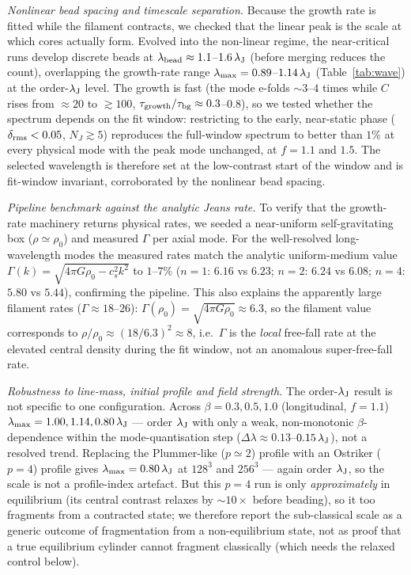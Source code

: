 \documentclass[usenatbib,twoside,twocolumn]{mnras}
\begin{document}
\emph{Nonlinear bead spacing and timescale separation.} Because the growth rate is fitted while the filament contracts, we checked that the linear peak is the scale at which cores actually form. Evolved into the non-linear regime, the near-critical runs develop discrete beads at $\lambda_{\rm bead}\approx1.1$--$1.6\,\lambda_{\rm J}$ (before merging reduces the count), overlapping the growth-rate range $\lambda_{\rm max}=0.89$--$1.14\,\lambda_{\rm J}$ (Table~\ref{tab:wave}) at the order-$\lambda_{\rm J}$ level. The growth is fast (the mode e-folds $\sim3$--$4$ times while $C$ rises from $\approx20$ to $\gtrsim100$, $\tau_{\rm growth}/\tau_{\rm bg}\approx0.3$--$0.8$), so we tested whether the spectrum depends on the fit window: restricting to the early, near-static phase ($\delta_{\rm rms}<0.05$, $N_J\gtrsim5$) reproduces the full-window spectrum to better than $1\%$ at every physical mode with the peak mode unchanged, at $f=1.1$ and $1.5$. The selected wavelength is therefore set at the low-contrast start of the window and is fit-window invariant, corroborated by the nonlinear bead spacing.

\emph{Pipeline benchmark against the analytic Jeans rate.} To verify that the growth-rate machinery returns physical rates, we seeded a near-uniform self-gravitating box ($\rho\simeq\rho_0$) and measured $\Gamma$ per axial mode. For the well-resolved long-wavelength modes the measured rates match the analytic uniform-medium value $\Gamma(k)=\sqrt{4\pi G\rho_0-c_s^2k^2}$ to $1$--$7\%$ ($n{=}1$: $6.16$ vs $6.23$; $n{=}2$: $6.24$ vs $6.08$; $n{=}4$: $5.80$ vs $5.44$), confirming the pipeline. This also explains the apparently large filament rates ($\Gamma\approx18$--$26$): $\Gamma(\rho_0)=\sqrt{4\pi G\rho_0}\approx6.3$, so the filament value corresponds to $\rho/\rho_0\approx(18/6.3)^2\approx8$, i.e.\ $\Gamma$ is the \emph{local} free-fall rate at the elevated central density during the fit window, not an anomalous super-free-fall rate.

\emph{Robustness to line-mass, initial profile and field strength.} The order-$\lambda_{\rm J}$ result is not specific to one configuration. Across $\beta=0.3,0.5,1.0$ (longitudinal, $f=1.1$) $\lambda_{\rm max}=1.00,1.14,0.80\,\lambda_{\rm J}$ --- order $\lambda_{\rm J}$ with only a weak, non-monotonic $\beta$-dependence within the mode-quantisation step ($\Delta\lambda\approx0.13$--$0.15\,\lambda_{\rm J}$), not a resolved trend. Replacing the Plummer-like ($p\simeq2$) profile with an Ostriker ($p=4$) profile gives $\lambda_{\rm max}=0.80\,\lambda_{\rm J}$ at $128^3$ and $256^3$ --- again order $\lambda_{\rm J}$, so the scale is not a profile-index artefact. But this $p=4$ run is only \emph{approximately} in equilibrium (its central contrast relaxes by $\sim10\times$ before beading), so it too fragments from a contracted state; we therefore report the sub-classical scale as a generic outcome of fragmentation from a non-equilibrium state, not as proof that a true equilibrium cylinder cannot fragment classically (which needs the relaxed control below).
\end{document}
